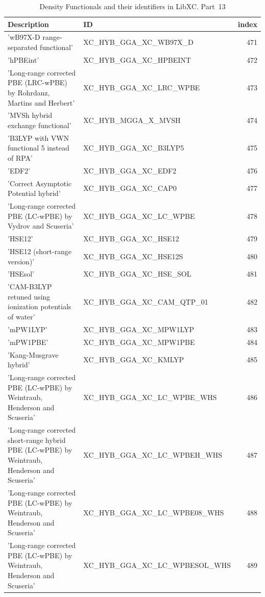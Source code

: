 \documentclass[final,12pt,makeidx,DIV=calc]{article}
\begin{document}
{{{{{{\begin{table}[!h]
\caption{Density Functionals and their identifiers in LibXC. Part~13}
\begin{center}
\begin{tabular}{llr}
\hline
\hline
Description & ID & index\\
\hline
  'wB97X-D range-separated functional' & XC\_HYB\_GGA\_XC\_WB97X\_D  &471\\
  'hPBEint' & XC\_HYB\_GGA\_XC\_HPBEINT  &472\\
  'Long-range corrected PBE (LRC-wPBE) by Rohrdanz, Martins and Herbert' & XC\_HYB\_GGA\_XC\_LRC\_WPBE  &473\\
  'MVSh hybrid exchange functional' & XC\_HYB\_MGGA\_X\_MVSH  &474\\
  'B3LYP with VWN functional 5 instead of RPA' & XC\_HYB\_GGA\_XC\_B3LYP5  &475\\
  'EDF2' & XC\_HYB\_GGA\_XC\_EDF2  &476\\
  'Correct Asymptotic Potential hybrid' & XC\_HYB\_GGA\_XC\_CAP0  &477\\
  'Long-range corrected PBE (LC-wPBE) by Vydrov and Scuseria' & XC\_HYB\_GGA\_XC\_LC\_WPBE  &478\\
  'HSE12' & XC\_HYB\_GGA\_XC\_HSE12  &479\\
  'HSE12 (short-range version)' & XC\_HYB\_GGA\_XC\_HSE12S  &480\\
  'HSEsol' & XC\_HYB\_GGA\_XC\_HSE\_SOL  &481\\
  'CAM-B3LYP retuned using ionization potentials of water' & XC\_HYB\_GGA\_XC\_CAM\_QTP\_01  &482\\
  'mPW1LYP' & XC\_HYB\_GGA\_XC\_MPW1LYP  &483\\
  'mPW1PBE' & XC\_HYB\_GGA\_XC\_MPW1PBE  &484\\
  'Kang-Musgrave hybrid' & XC\_HYB\_GGA\_XC\_KMLYP  &485\\
  'Long-range corrected PBE (LC-wPBE) by Weintraub, Henderson and Scuseria' & XC\_HYB\_GGA\_XC\_LC\_WPBE\_WHS  &486\\
  'Long-range corrected short-range hybrid PBE (LC-wPBE) by Weintraub, Henderson and Scuseria' & XC\_HYB\_GGA\_XC\_LC\_WPBEH\_WHS  &487\\
  'Long-range corrected PBE (LC-wPBE) by Weintraub, Henderson and Scuseria' & XC\_HYB\_GGA\_XC\_LC\_WPBE08\_WHS  &488\\
  'Long-range corrected PBE (LC-wPBE) by Weintraub, Henderson and Scuseria' & XC\_HYB\_GGA\_XC\_LC\_WPBESOL\_WHS  &489\\

\end{tabular}
\end{center}
\end{table}}}}}}}
\end{document}
